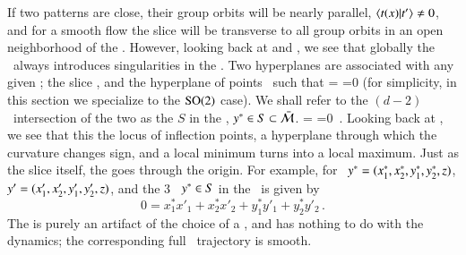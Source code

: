

If  two patterns are close, their group orbits will be nearly parallel,
$\braket{\groupTan(\ssp)}{\sliceTan{}} \neq 0$, and for a smooth flow the
slice will be transverse to all group orbits in an open
neighborhood of the {\template} \slicep. However, looking back at
 and , we see that globally the
\mslices\ always introduces singularities in the \reducedsp. Two hyperplanes are
associated with  any given {\template} \slicep; the slice ,
and the hyperplane of points \sspSing\ such that
\beq
\braket{\groupTan(\sspSing)}{\sliceTan{}}
 =
\braket{\sspSing}{\Lg^2\slicep}
 =0
(for simplicity, in this section we specialize to the  $\SOn{2}$ case).
We shall refer to the $(d\!-\!2)$\dmn\ intersection of the two as
the {\em \sset} $S$ in the \reducedsp, $\sspRSing \in S \subset \pSRed$.
\beq
\braket{\groupTan(\sspRSing)}{\sliceTan{}}
 =
\braket{\sspRSing}{\Lg^2\slicep}
 =0
\,.
Looking back at , we see that this the locus
of inflection points, a hyperplane through which the curvature changes
sign, and a local minimum turns into a local maximum.
Just as the slice itself, the {\em \sset} goes through the origin.
For example, for \cLe\
$\sspRSing = (x_1^*,x_2^*,y_1^*,y_2^*,z)$,
$\slicep = (x_1',x_2',y_1',y_2',z)$,
and the 3\dmn\ {\sset} $\sspRSing \in S$ in the \reducedsp\ is given by
\[
0 = {x_1^* x'_1+x_2^* x'_2+y_1^* y'_1+y_2^* y'_2}
\,.
\]
The {\sset} is purely an artifact of the choice of a
{\template}, and has nothing to do with the dynamics; the corresponding full
\statesp\ trajectory is smooth.


